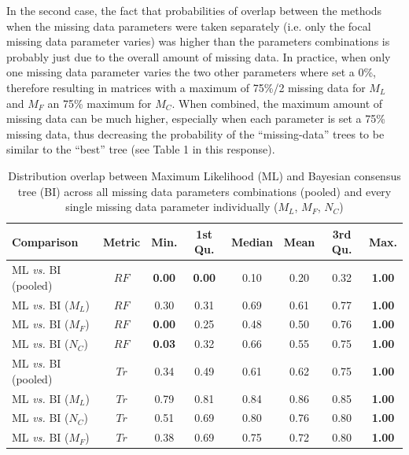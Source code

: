 \documentclass[12pt,letterpaper]{article}
\begin{document}
\begin{enumerate}
In the second case, the fact that probabilities of overlap between the methods when the missing data parameters were taken separately (i.e. only the focal missing data parameter varies) was higher than the parameters combinations is probably just due to the overall amount of missing data.
In practice, when only one missing data parameter varies the two other parameters where set a 0\%, therefore resulting in matrices with a maximum of 75\%/2 missing data for $M_L$ and $M_F$ an 75\% maximum for $M_C$.
When combined, the maximum amount of missing data can be much higher, especially when each parameter is set a 75\% missing data, thus decreasing the probability of the ``missing-data'' trees to be similar to the ``best'' tree (see Table 1 in this response).

\begin{table}[!ht]
\caption{Distribution overlap between Maximum Likelihood (ML) and Bayesian consensus tree (BI) across all missing data parameters combinations (pooled) and every single missing data parameter individually ($M_L$, $M_F$, $N_C$)}
\centering
\begin{tabular}{|l|c|c|c|c|c|c|c|}
  \hline
 Comparison &  Metric & Min. & 1st Qu. & Median & Mean & 3rd Qu. & Max. \\ 
  \hline
    ML \textit{vs.} BI (pooled) & $RF$ & \textbf{0.00} & \textbf{0.00} & 0.10 & 0.20 & 0.32 & \textbf{1.00} \\ 
    ML \textit{vs.} BI ($M_L$)  & $RF$ & 0.30          & 0.31          & 0.69 & 0.61 & 0.77 & \textbf{1.00} \\ 
    ML \textit{vs.} BI ($M_F$)  & $RF$ & \textbf{0.00} & 0.25          & 0.48 & 0.50 & 0.76 & \textbf{1.00} \\ 
    ML \textit{vs.} BI ($N_C$)  & $RF$ & \textbf{0.03} & 0.32          & 0.66 & 0.55 & 0.75 & \textbf{1.00} \\
    ML \textit{vs.} BI (pooled) & $Tr$ & 0.34          & 0.49          & 0.61 & 0.62 & 0.75 & \textbf{1.00} \\
    ML \textit{vs.} BI ($M_L$)  & $Tr$ & 0.79          & 0.81          & 0.84 & 0.86 & 0.85 & \textbf{1.00} \\  
    ML \textit{vs.} BI ($N_C$)  & $Tr$ & 0.51          & 0.69          & 0.80 & 0.76 & 0.80 & \textbf{1.00} \\
    ML \textit{vs.} BI ($M_F$)  & $Tr$ & 0.38          & 0.69          & 0.75 & 0.72 & 0.80 & \textbf{1.00} \\  
   \hline
\end{tabular}
\label{Tab_Results-Difference_methods}
\end{table}



\end{enumerate}
\end{document}
